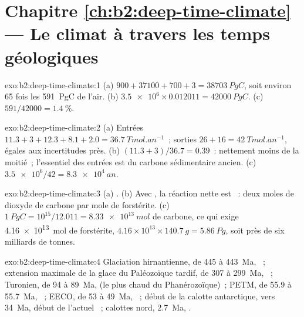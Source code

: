 \section*{Chapitre \ref{ch:b2:deep-time-climate} --- Le climat à travers les temps géologiques}

\begin{solution}{exo:b2:deep-time-climate:1}
(a) $900 + 37100 + 700 + 3 = \qty{38703}{PgC}$, soit environ 65 fois les \qty{591}{PgC} de l'air.
(b) $\num{3.5e6}\times0.012011 = \qty{42000}{PgC}$. (c) $591/42000 = \qty{1.4}{\percent}$.
\end{solution}

\begin{solution}{exo:b2:deep-time-climate:2}
(a) Entrées $11.3 + 3 + 12.3 + 8.1 + 2.0 = \qty{36.7}{Tmol.an^{-1}}$~; sorties $26 + 16 =
\qty{42}{Tmol.an^{-1}}$, égales aux incertitudes près. (b) $(11.3 + 3)/36.7 = 0.39$~: nettement
moins de la moitié~; l'essentiel des entrées est du carbone sédimentaire ancien. (c) $\num{3.5e6}/42 = \qty{8.3e4}{an}$.
\end{solution}

\begin{solution}{exo:b2:deep-time-climate:3}
(a) . (b) Avec , la réaction nette est ~: deux moles
de dioxyde de carbone par mole de forstérite. (c) $\qty{1}{PgC} = 10^{15}/12.011 =
\qty{8.33e13}{mol}$ de carbone, ce qui exige \qty{4.16e13}{mol} de forstérite, $4.16\times10^{13}
\times\qty{140.7}{g} = \qty{5.86}{Pg}$, soit près de six milliards de tonnes.
\end{solution}

\begin{solution}{exo:b2:deep-time-climate:4}
Glaciation hirnantienne, de 445 à \qty{443}{Ma}, ~; extension maximale de la glace du Paléozoïque tardif, de 307 à
\qty{299}{Ma}, ~; Turonien, de 94 à \qty{89}{Ma},  (le plus chaud du Phanérozoïque)~;
PETM, de 55.9 à \qty{55.7}{Ma}, ~; EECO, de 53 à \qty{49}{Ma}, ~; début de la
calotte antarctique, vers \qty{34}{Ma}, début de l'actuel ~; calottes nord,
\qty{2.7}{Ma}, .
\end{solution}

